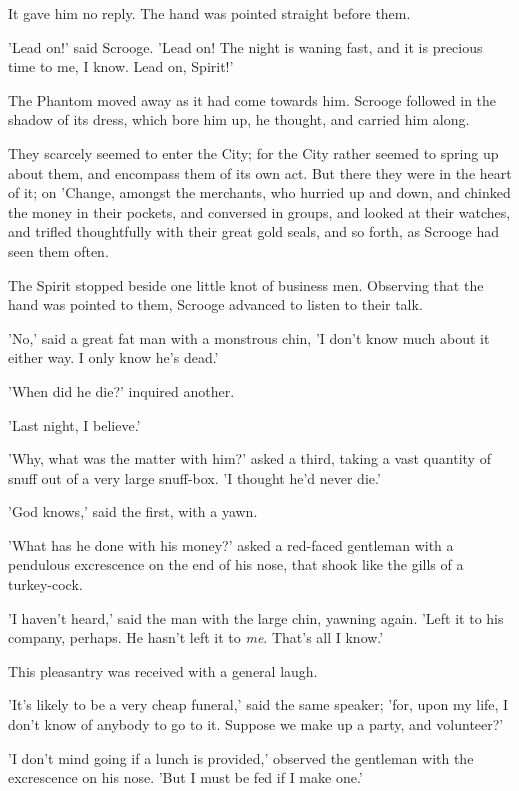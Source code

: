 It gave him no reply. The hand was pointed straight before them.

'Lead on!' said Scrooge. 'Lead on! The night is waning fast, and it is
precious time to me, I know. Lead on, Spirit!'

The Phantom moved away as it had come towards him. Scrooge followed in
the shadow of its dress, which bore him up, he thought, and carried him
along.

They scarcely seemed to enter the City; for the City rather seemed to
spring up about them, and encompass them of its own act. But there they
were in the heart of it; on 'Change, amongst the merchants, who hurried
up and down, and chinked the money in their pockets, and conversed in
groups, and looked at their watches, and trifled thoughtfully with their
great gold seals, and so forth, as Scrooge had seen them often.

The Spirit stopped beside one little knot of business men. Observing
that the hand was pointed to them, Scrooge advanced to listen to their
talk.

'No,' said a great fat man with a monstrous chin, 'I don't know much
about it either way. I only know he's dead.'

'When did he die?' inquired another.

'Last night, I believe.'

'Why, what was the matter with him?' asked a third, taking a vast
quantity of snuff out of a very large snuff-box. 'I thought he'd never
die.'

'God knows,' said the first, with a yawn.

'What has he done with his money?' asked a red-faced gentleman with a
pendulous excrescence on the end of his nose, that shook like the gills
of a turkey-cock.

'I haven't heard,' said the man with the large chin, yawning again.
'Left it to his company, perhaps. He hasn't left it to \emph{me}. That's all
I know.'

This pleasantry was received with a general laugh.

'It's likely to be a very cheap funeral,' said the same speaker; 'for,
upon my life, I don't know of anybody to go to it. Suppose we make up a
party, and volunteer?'

'I don't mind going if a lunch is provided,' observed the gentleman with
the excrescence on his nose. 'But I must be fed if I make one.'


